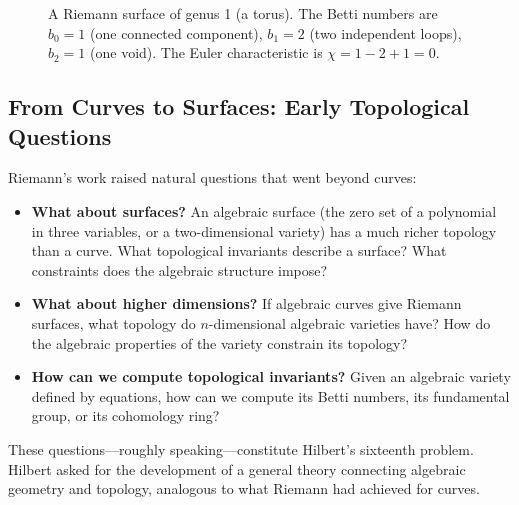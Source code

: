 \begin{figure}[htbp]
\centering
{}
\caption{A Riemann surface of genus 1 (a torus). The Betti numbers are $b_0 = 1$ (one connected component), $b_1 = 2$ (two independent loops), $b_2 = 1$ (one void). The Euler characteristic is $\chi = 1 - 2 + 1 = 0$.}
\label{fig:riemann-surface-genus-1}
\end{figure}

\subsection{From Curves to Surfaces: Early Topological Questions}

Riemann's work raised natural questions that went beyond curves:

\begin{itemize}
    \item \textbf{What about surfaces?} An algebraic surface (the zero set of a polynomial in three variables, or a two-dimensional variety) has a much richer topology than a curve. What topological invariants describe a surface? What constraints does the algebraic structure impose?

    \item \textbf{What about higher dimensions?} If algebraic curves give Riemann surfaces, what topology do $n$-dimensional algebraic varieties have? How do the algebraic properties of the variety constrain its topology?

    \item \textbf{How can we compute topological invariants?} Given an algebraic variety defined by equations, how can we compute its Betti numbers, its fundamental group, or its cohomology ring?
\end{itemize}

These questions---roughly speaking---constitute Hilbert's sixteenth problem. Hilbert asked for the development of a general theory connecting algebraic geometry and topology, analogous to what Riemann had achieved for curves.

